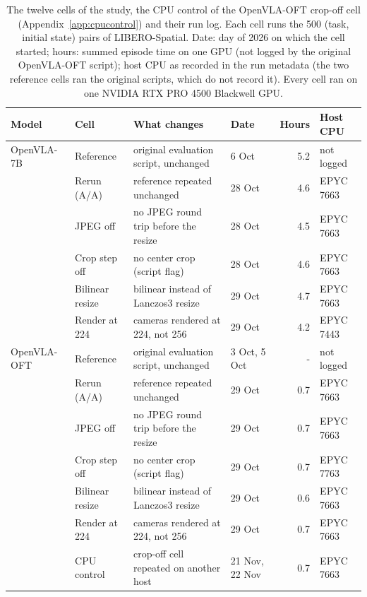 \begin{table}[t]
\caption{The twelve cells of the study, the CPU control of the OpenVLA-OFT crop-off cell (Appendix~\ref{app:cpucontrol}) and their run log. Each cell runs the 500 (task, initial state) pairs of LIBERO-Spatial. Date: day of 2026 on which the cell started; hours: summed episode time on one GPU (not logged by the original OpenVLA-OFT script); host CPU as recorded in the run metadata (the two reference cells ran the original scripts, which do not record it). Every cell ran on one NVIDIA RTX PRO 4500 Blackwell GPU.}
\label{tab:cells}
\centering
\scriptsize
\setlength{\tabcolsep}{3pt}
\begin{tabular}{@{}llL{0.36\columnwidth}lrl@{}}
\toprule
Model & Cell & What changes & Date & Hours & Host CPU \\
\midrule
OpenVLA-7B & Reference & original evaluation script, unchanged & 6 Oct & 5.2 & not logged \\
 & Rerun (A/A) & reference repeated unchanged & 28 Oct & 4.6 & EPYC 7663 \\
 & JPEG off & no JPEG round trip before the resize & 28 Oct & 4.5 & EPYC 7663 \\
 & Crop step off & no center crop (script flag) & 28 Oct & 4.6 & EPYC 7663 \\
 & Bilinear resize & bilinear instead of Lanczos3 resize & 29 Oct & 4.7 & EPYC 7663 \\
 & Render at 224 & cameras rendered at 224, not 256 & 29 Oct & 4.2 & EPYC 7443 \\
\midrule
OpenVLA-OFT & Reference & original evaluation script, unchanged & 3 Oct, 5 Oct & - & not logged \\
 & Rerun (A/A) & reference repeated unchanged & 29 Oct & 0.7 & EPYC 7663 \\
 & JPEG off & no JPEG round trip before the resize & 29 Oct & 0.7 & EPYC 7663 \\
 & Crop step off & no center crop (script flag) & 29 Oct & 0.7 & EPYC 7763 \\
 & Bilinear resize & bilinear instead of Lanczos3 resize & 29 Oct & 0.6 & EPYC 7663 \\
 & Render at 224 & cameras rendered at 224, not 256 & 29 Oct & 0.7 & EPYC 7663 \\
 & CPU control & crop-off cell repeated on another host & 21 Nov, 22 Nov & 0.7 & EPYC 7663 \\
\bottomrule
\end{tabular}
\end{table}
